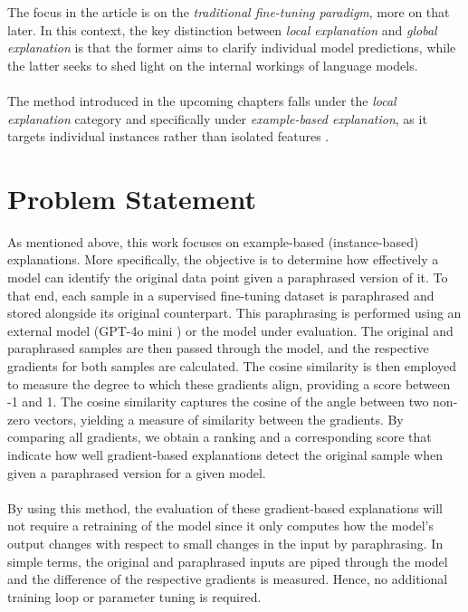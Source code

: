 The focus in the article is on the \textit{traditional fine-tuning paradigm}, more on that later. In this context, the key distinction between \textit{local explanation} and \textit{global explanation} is that the former aims to clarify individual model predictions, while the latter seeks to shed light on the internal workings of language models.
\\\\
The method introduced in the upcoming chapters falls under the \textit{local explanation} category and specifically under \textit{example-based explanation}, as it targets individual instances rather than isolated features \cite{zhao2023explainabilitylargelanguagemodels}.

\section{Problem Statement} \label{sec:problem_statement}
As mentioned above, this work focuses on example-based (instance-based) explanations. More specifically, the objective is to determine how effectively a model can identify the original data point given a paraphrased version of it. To that end, each sample in a supervised fine-tuning dataset is paraphrased and stored alongside its original counterpart. This paraphrasing is performed using an external model (GPT-4o mini \cite{openai_2024_gpt4o_mini}) or the model under evaluation. The original and paraphrased samples are then passed through the model, and the respective gradients for both samples are calculated. The cosine similarity is then employed to measure the degree to which these gradients align, providing a score between -1 and 1. The cosine similarity captures the cosine of the angle between two non-zero vectors, yielding a measure of similarity between the gradients. By comparing all gradients, we obtain a ranking and a corresponding score that indicate how well gradient-based explanations detect the original sample when given a paraphrased version for a given model.
\\\\
By using this method, the evaluation of these gradient-based explanations will not require a retraining of the model since it only computes how the model's output changes with respect to small changes in the input by paraphrasing. In simple terms, the original and paraphrased inputs are piped through the model and the difference of the respective gradients is measured. Hence, no additional training loop or parameter tuning is required. 
\\\\
